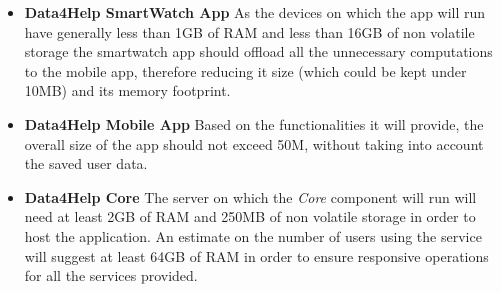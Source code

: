 \begin{itemize}
    \item \textbf{Data4Help SmartWatch App} As the devices on which the app will run have generally less than 1GB of RAM and less than 16GB of non volatile storage the smartwatch app should offload all the unnecessary computations to the mobile app, therefore reducing it size (which could be kept under 10MB) and its memory footprint.
    \item \textbf{Data4Help Mobile App} Based on the functionalities it will provide, the overall size of the app should not exceed 50M, without taking into account the saved user data.
    \item \textbf{Data4Help Core} The server on which the \textit{Core} component will run will need at least 2GB of RAM and 250MB of non volatile storage in order to host the application. \newline An estimate on the number of users using the service will suggest at least 64GB of RAM in order to ensure responsive operations for all the services provided.
    
\end{itemize}

